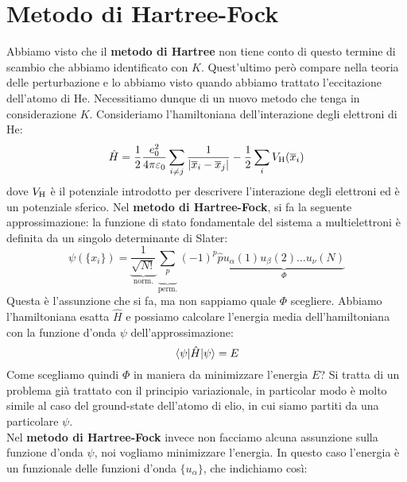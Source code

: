 \vspace{1.0cm}
\newline
{}

\section{Metodo di Hartree-Fock}

Abbiamo visto che il \textbf{metodo di Hartree} non tiene conto di questo termine di scambio che abbiamo identificato con $K$. Quest'ultimo però compare nella teoria delle perturbazione e lo abbiamo visto quando abbiamo trattato l'eccitazione dell'atomo di He. Necessitiamo dunque di un nuovo metodo che tenga in considerazione $K$. Consideriamo l'hamiltoniana dell'interazione degli elettroni di He:
\begin{equation*}
    \hat H = \frac12\frac{e_0^2}{4\pi\varepsilon_0}\sum_{i\neq j}\frac{1}{|\overline{x}_i-\overline{x}_j|}-\frac 12\sum_{i}V_{\text H}(\overline{x}_i)
\end{equation*}
\noindent dove $V_{\text H}$ è il potenziale introdotto per descrivere l'interazione degli elettroni ed è un potenziale sferico.
Nel \textbf{metodo di Hartree-Fock}, si fa la seguente approssimazione: la funzione di stato fondamentale del sistema a multielettroni è definita da un singolo determinante di Slater:
\begin{equation*}
    \psi(\{x_i\})=\underbrace{\frac{1}{\sqrt{N!}}}_{\text{norm.}}\underbrace{\sum_{p}}_{\text{perm.}}(-1)^p\hat p \underbrace{u_\alpha(1)u_\beta(2)\dots u_\nu(N)}_{\Phi}
\end{equation*}
\noindent Questa è l'assunzione che si fa, ma non sappiamo quale $\Phi$ scegliere. Abbiamo l'hamiltoniana esatta $\hat H$ e possiamo calcolare l'energia media dell'hamiltoniana con la funzione d'onda $\psi$ dell'approssimazione:
\begin{equation*}
    \mel{\psi}{\hat H}{\psi}=E
\end{equation*}
Come scegliamo quindi $\Phi$ in maniera da minimizzare l'energia $E$? Si tratta di un problema già trattato con il principio variazionale, in particolar modo è molto simile al caso del ground-state dell'atomo di elio, in cui siamo partiti da una particolare $\psi$.\\
Nel \textbf{metodo di Hartree-Fock} invece non facciamo alcuna assunzione sulla funzione d'onda $\psi$, noi vogliamo minimizzare l'energia. In questo caso l'energia è un funzionale delle funzioni d'onda $\{u_\alpha\}$, che indichiamo così:
